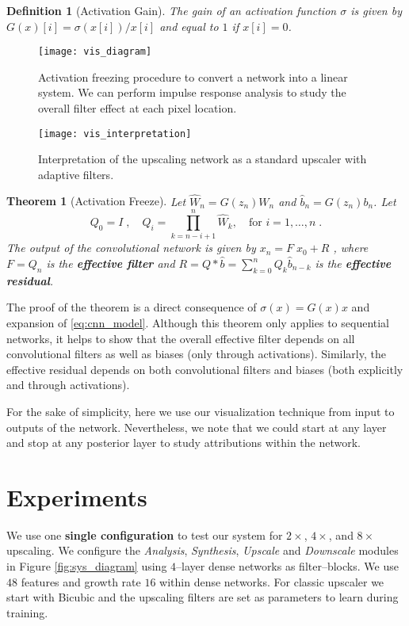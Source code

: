 \documentclass[letterpaper]{article}
\newtheorem{defn}{Definition}
\newtheorem{thm}{Theorem}
\begin{document}
\begin{defn}[Activation Gain]
    The \emph{gain} of an activation function $\sigma$ is given by $G(x)[i]=\sigma(x[i])/x[i]$ and equal to $1$ if $x[i]=0$.
\end{defn}
\begin{figure}
  \centering
  \texttt{[image: vis\_diagram]}
  \caption{Activation freezing procedure to convert a network into a linear system. We can perform impulse response analysis to study the overall filter effect at each pixel location. \label{fig:vis_diagram}}
\end{figure}
\begin{figure}
  \centering
  \texttt{[image: vis\_interpretation]}
  \caption{Interpretation of the upscaling network as a standard upscaler with adaptive filters. \label{fig:vis_interpretation}}
\end{figure}

\begin{thm}[Activation Freeze] \label{thm:act_freeze}
Let $\hat{W}_n = G(z_n) W_n$ and $\hat{b}_n = G(z_n) b_n$. Let
\begin{equation}
    Q_0 = I \;, \quad Q_i = \prod_{k=n-i+1}^n \hat{W}_k, \quad\text{for } i=1,\ldots,n \;.
\end{equation}
The output of the convolutional network is given by $x_n = F \; x_0 + R$ , where $F = Q_n$ is the \textbf{effective filter} and $R = Q \ast \hat{b} = \sum_{k=0}^n Q_k \hat{b}_{n-k}$ is the \textbf{effective residual}.
\end{thm}
The proof of the theorem is a direct consequence of $\sigma(x) = G(x) x$ and expansion of \eqref{eq:cnn_model}. Although this theorem only applies to sequential networks, it helps to show that the overall effective filter depends on all convolutional filters as well as biases (only through activations). Similarly, the effective residual depends on both convolutional filters and biases (both explicitly and through activations).

For the sake of simplicity, here we use our visualization technique from input to outputs of the network. Nevertheless, we note that we could start at any layer and stop at any posterior layer to study attributions within the network.

\section{Experiments}
\label{sec:experiments}
We use one \textbf{single configuration} to test our system for $2\times$, $4\times$, and $8\times$ upscaling. We configure the \emph{Analysis}, \emph{Synthesis}, \emph{Upscale} and \emph{Downscale} modules in Figure \ref{fig:sys_diagram} using $4$--layer dense networks \cite{huang2017densely}  as filter--blocks. We use $48$ features and growth rate $16$ within dense networks. For classic upscaler we start with Bicubic and the upscaling filters are set as parameters to learn during training.
\end{document}
